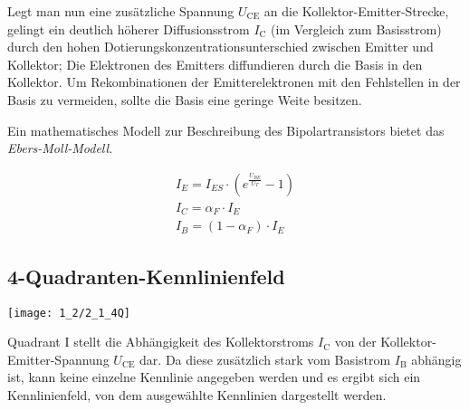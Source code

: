 \documentclass[a4paper, 12pt]{article}
\begin{document}
Legt man nun eine zusätzliche Spannung $U_\textrm{CE}$ an die
Kollektor-Emitter-Strecke, gelingt ein deutlich höherer Diffusionsstrom $I_\textrm{C}$ (im
Vergleich zum Basisstrom) durch den hohen Dotierungskonzentrationsunterschied
zwischen Emitter und Kollektor; Die Elektronen des Emitters diffundieren durch
die Basis in den
Kollektor. Um Rekombinationen der Emitterelektronen mit den Fehlstellen in der Basis
zu vermeiden, sollte die Basis eine geringe Weite besitzen.

Ein mathematisches Modell zur Beschreibung des Bipolartransistors bietet das \emph{Ebers-Moll-Modell}.

\begin{center}
\end{center}

\begin{gather*}
  I_E = I_{ES} \cdot \left( e^{\frac{U_{BE}}{U_T}} -1 \right)\\
  I_C = \alpha_F \cdot I_E\\
  I_B = (1 - \alpha_F) \cdot I_E
\end{gather*}



\subsection{4-Quadranten-Kennlinienfeld}

\begin{center}
  \texttt{[image: 1\_2/2\_1\_4Q]}
\end{center}

Quadrant I stellt die Abhängigkeit des Kollektorstroms $I_{\textrm{C}}$ von der
Kollektor-Emitter-Spannung $U_{\textrm{CE}}$ dar. Da diese zusätzlich stark vom
Basistrom $I_{\textrm{B}}$ abhängig ist, kann keine einzelne Kennlinie
angegeben werden und es ergibt sich ein Kennlinienfeld, von dem ausgewählte
Kennlinien dargestellt werden.\\
\end{document}
